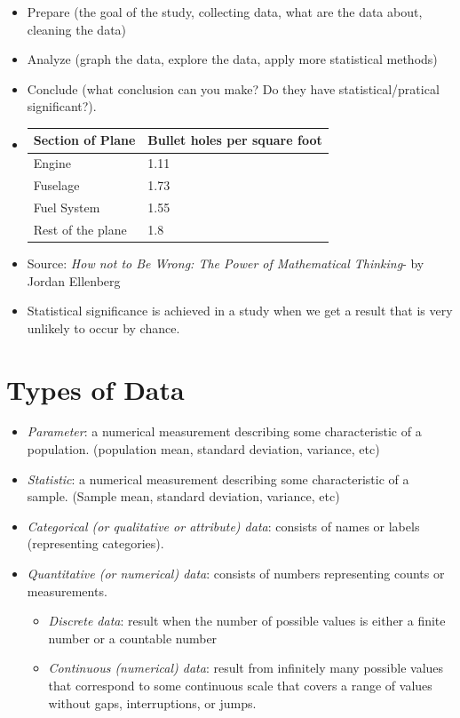\documentclass[]{book}
\providecommand{\tightlist}{%
  \setlength{\itemsep}{0pt}\setlength{\parskip}{0pt}}
\begin{document}
\begin{itemize}
\item
  Prepare (the goal of the study, collecting data, what are the data about, cleaning the data)\\
\item
  Analyze (graph the data, explore the data, apply more statistical methods)\\
\item
  Conclude (what conclusion can you make? Do they have statistical/pratical significant?).
\item
  \begin{longtable}[]{@{}ll@{}}
  \toprule
  Section of Plane & Bullet holes per square foot\tabularnewline
  \midrule
  \endhead
  Engine & 1.11\tabularnewline
  Fuselage & 1.73\tabularnewline
  Fuel System & 1.55\tabularnewline
  Rest of the plane & 1.8\tabularnewline
  \bottomrule
  \end{longtable}
\item
  Source: \emph{How not to Be Wrong: The Power of Mathematical Thinking}- by Jordan Ellenberg
\item
  Statistical significance is achieved in a study when we get a result that is very unlikely to occur by chance.
\end{itemize}

\hypertarget{types-of-data}{%
\section{Types of Data}\label{types-of-data}}

\begin{itemize}
\tightlist
\item
  \emph{Parameter}: a numerical measurement describing some characteristic of a population. (population mean, standard deviation, variance, etc)
\item
  \emph{Statistic}: a numerical measurement describing some characteristic of a sample. (Sample mean, standard deviation, variance, etc)
\item
  \emph{Categorical (or qualitative or attribute) data}: consists of names or labels (representing categories).
\item
  \emph{Quantitative (or numerical) data}: consists of numbers representing counts or measurements.

  \begin{itemize}
  \tightlist
  \item
    \emph{Discrete data}: result when the number of possible values is either a finite number or a countable number
  \item
    \emph{Continuous (numerical) data}: result from infinitely many possible values that correspond to some continuous scale that covers a range of values without gaps, interruptions, or jumps.
  \end{itemize}
\end{itemize}
\end{document}
